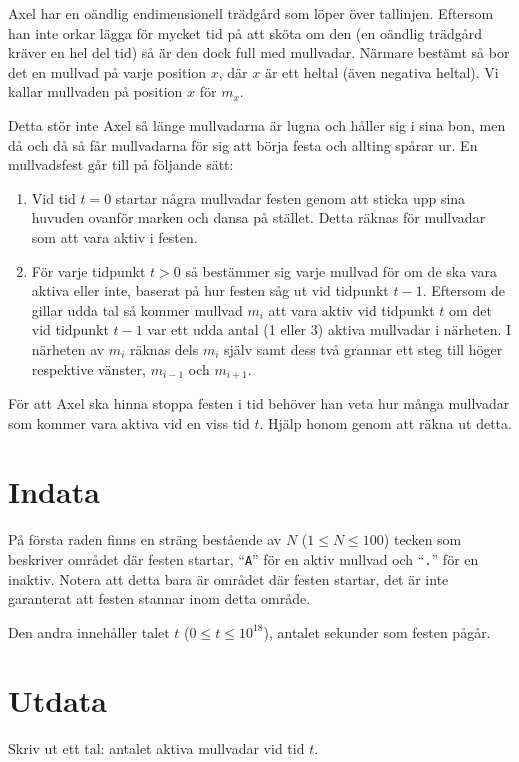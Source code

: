 
Axel har en oändlig endimensionell trädgård som löper över tallinjen. Eftersom han inte orkar lägga för mycket tid på att sköta om den (en oändlig trädgård kräver en hel del tid) så är den dock full med mullvadar. Närmare bestämt så bor det en mullvad på varje position $x$, där $x$ är ett heltal (även negativa heltal). Vi kallar mullvaden på position $x$ för $m_x$.

Detta stör inte Axel så länge mullvadarna är lugna och håller sig i sina bon, men då och då så får mullvadarna för sig att börja festa och allting spårar ur. En mullvadsfest går till på följande sätt:
\begin{enumerate}
\item Vid tid $t=0$ startar några mullvadar festen genom att sticka upp sina huvuden ovanför marken och dansa på stället. Detta räknas för mullvadar som att vara aktiv i festen.
\item För varje tidpunkt $t > 0$ så bestämmer sig varje mullvad för om de ska vara aktiva eller inte, baserat på hur festen såg ut vid tidpunkt $t-1$. Eftersom de gillar udda tal så kommer mullvad $m_i$ att vara aktiv vid tidpunkt $t$ om det vid tidpunkt $t-1$ var ett udda antal (1 eller 3) aktiva mullvadar i närheten. I närheten av $m_i$ räknas dels $m_i$ själv samt dess två grannar ett steg till höger respektive vänster, $m_{i-1}$ och $m_{i+1}$.
\end{enumerate}

För att Axel ska hinna stoppa festen i tid behöver han veta hur många mullvadar som kommer vara aktiva vid en viss tid $t$. Hjälp honom genom att räkna ut detta.

\section*{Indata}
På första raden finns en sträng bestående av $N$ ($1 \leq N \leq 100$) tecken som beskriver området där festen startar, ``\texttt{A}''
för en aktiv mullvad och ``\texttt{.}'' för en inaktiv. Notera att detta bara är området där festen startar, det
är inte garanterat att festen stannar inom detta område.

Den andra innehåller talet $t$ ($0 \leq t \leq 10^{18}$), antalet sekunder som festen pågår.

\section*{Utdata}
Skriv ut ett tal: antalet aktiva mullvadar vid tid $t$.


